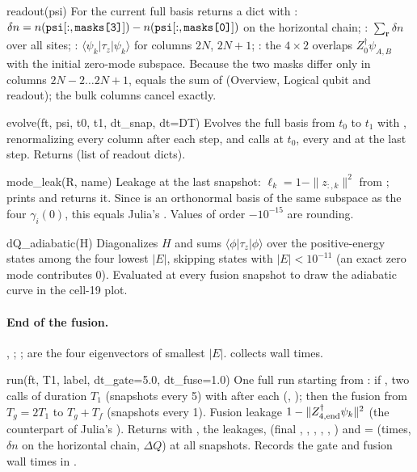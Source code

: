 \begin{function}{readout(psi)}
For the current full basis  returns a dict with
: $\delta n = n(\text{\texttt{psi}}[:, \text{\texttt{masks[3]}}]) - n(\text{\texttt{psi}}[:, \text{\texttt{masks[0]}}])$ on the horizontal chain;
: $\sum_{\mathbf r}\delta n$ over all sites; : $\langle\psi_k|\tau_z|\psi_k\rangle$ for columns $2N$, $2N+1$;
: the $4\times2$ overlaps $Z_0^\dagger\psi_{A,B}$ with the initial zero-mode subspace. Because the two masks differ only in
columns $2N-2\dots2N+1$,  equals the sum of  (Overview, Logical qubit and readout); the bulk columns cancel exactly.
\end{function}

\begin{function}{evolve(ft, psi, t0, t1, dt\_snap, dt=DT)}
Evolves the full basis from $t_0$ to $t_1$ with , renormalizing every column after each step, and calls  at $t_0$, every
 and at the last step. Returns  (list of readout dicts).
\end{function}

\begin{function}{mode\_leak(R, name)}
Leakage at the last snapshot: $\ell_k = 1 - \|z_{:,k}\|^2$ from ; prints and returns it. Since  is an orthonormal basis of
the same subspace as the four $\gamma_i(0)$, this equals Julia's . Values of order $-10^{-15}$ are rounding.
\end{function}

\begin{function}{dQ\_adiabatic(H)}
Diagonalizes $H$ and sums $\langle\phi|\tau_z|\phi\rangle$ over the positive-energy states among the four lowest $|E|$, skipping states with
$|E| < 10^{-11}$ (an exact zero mode contributes 0). Evaluated at every fusion snapshot to draw the adiabatic curve in the cell-19 plot.
\end{function}

\paragraph{End of the fusion.} , ; ;  are the four eigenvectors of
smallest $|E|$.  collects wall times.

\begin{function}{run(ft, T1, label, dt\_gate=5.0, dt\_fuse=1.0)}
One full run starting from : if , two  calls of duration $T_1$ (snapshots every 5) with 
after each (, ); then the fusion from $T_g = 2T_1$ to $T_g + T_f$ (snapshots every 1). Fusion leakage
$1 - \|Z_{4,\rm end}^\dagger\psi_k\|^2$ (the counterpart of Julia's ). Returns  with , the leakages,
 (final , , , , , ) and  = (times,
$\delta n$ on the horizontal chain, $\Delta Q$) at all snapshots. Records the gate and fusion wall times in .
\end{function}


